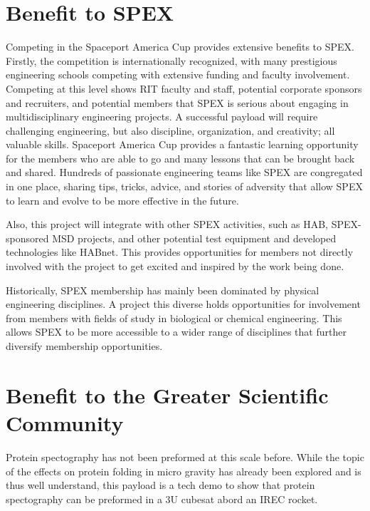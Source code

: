 \documentclass[conference]{IEEEtran} %
\begin{document}
\section{Benefit to SPEX}
\label{sec:benefit-spex}

Competing in the Spaceport America Cup provides extensive benefits to SPEX. Firstly, the competition is internationally recognized, with many prestigious engineering schools competing with extensive funding and faculty involvement. Competing at this level shows RIT faculty and staff, potential corporate sponsors and recruiters, and potential members that SPEX is serious about engaging in multidisciplinary engineering projects. A successful payload will require challenging engineering, but also discipline, organization, and creativity; all valuable skills. Spaceport America Cup provides a fantastic learning opportunity for the members who are able to go and many lessons that can be brought back and shared. Hundreds of passionate engineering teams like SPEX are congregated in one place, sharing tips, tricks, advice, and stories of adversity that allow SPEX to learn and evolve to be more effective in the future.

Also, this project will integrate with other SPEX activities, such as HAB, SPEX-sponsored MSD projects, and other potential test equipment and developed technologies like HABnet. This provides opportunities for members not directly involved with the project to get excited and inspired by the work being done.

Historically, SPEX membership has mainly been dominated by physical engineering disciplines. A project this diverse holds opportunities for involvement from members with fields of study in biological or chemical engineering. This allows SPEX to be more accessible to a wider range of disciplines that further diversify membership opportunities.

\section{Benefit to the Greater Scientific Community}
\label{sec:benefit-sci}

Protein spectography has not been preformed at this scale before. While the topic of the effects on protein folding in micro gravity has already been explored and is thus well understand, this payload is a tech demo to show that protein spectography can be preformed in a 3U cubesat abord an IREC rocket. 
\end{document}
